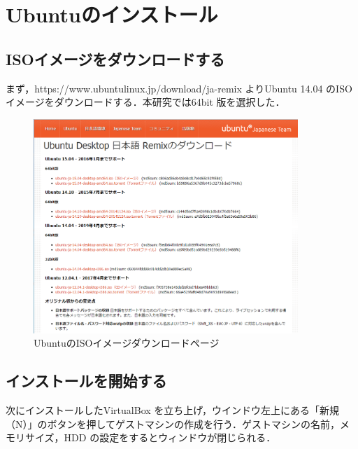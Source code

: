 \section{Ubuntuのインストール}

\subsection{ISOイメージをダウンロードする}

まず，https://www.ubuntulinux.jp/download/ja-remix よりUbuntu 14.04 のISO イメージをダウンロードする．本研究では64bit 版を選択した．



\begin{figure}[H]
\centering
\includegraphics[width=10cm]{UbuntuDL.png}
\caption{UbuntuのISOイメージダウンロードページ}\label{サンプル図}
\end{figure}





\subsection{インストールを開始する}

次にインストールしたVirtualBox を立ち上げ，ウインドウ左上にある「新規（N）」のボタンを押してゲストマシンの作成を行う．ゲストマシンの名前，メモリサイズ，HDD の設定をするとウィンドウが閉じられる．

